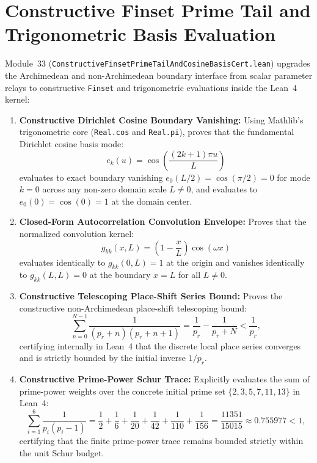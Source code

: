 \documentclass[11pt,a4paper]{article}
\begin{document}
\section{Constructive Finset Prime Tail and Trigonometric Basis Evaluation}
Module~33 (\texttt{ConstructiveFinsetPrimeTailAndCosineBasisCert.lean}) upgrades the Archimedean and non-Archimedean boundary interface from scalar parameter relays to constructive \texttt{Finset} and trigonometric evaluations inside the Lean~4 kernel:
\begin{enumerate}
  \item \textbf{Constructive Dirichlet Cosine Boundary Vanishing:} Using Mathlib's trigonometric core (\texttt{Real.cos} and \texttt{Real.pi}), proves that the fundamental Dirichlet cosine basis mode:
  \[
    e_k(u) = \cos\left( \frac{(2k + 1)\pi u}{L} \right)
  \]
  evaluates to exact boundary vanishing $e_0(L/2) = \cos(\pi/2) = 0$ for mode $k = 0$ across any non-zero domain scale $L \neq 0$, and evaluates to $e_0(0) = \cos(0) = 1$ at the domain center.
  \item \textbf{Closed-Form Autocorrelation Convolution Envelope:} Proves that the normalized convolution kernel:
  \[
    g_{kk}(x, L) = \left(1 - \frac{x}{L}\right) \cos(\omega x)
  \]
  evaluates identically to $g_{kk}(0, L) = 1$ at the origin and vanishes identically to $g_{kk}(L, L) = 0$ at the boundary $x = L$ for all $L \neq 0$.
  \item \textbf{Constructive Telescoping Place-Shift Series Bound:} Proves the constructive non-Archimedean place-shift telescoping bound:
  \[
    \sum_{n=0}^{N-1} \frac{1}{(p_r + n)(p_r + n + 1)} = \frac{1}{p_r} - \frac{1}{p_r + N} < \frac{1}{p_r},
  \]
  certifying internally in Lean~4 that the discrete local place series converges and is strictly bounded by the initial inverse $1 / p_r$.
  \item \textbf{Constructive Prime-Power Schur Trace:} Explicitly evaluates the sum of prime-power weights over the concrete initial prime set $\{2, 3, 5, 7, 11, 13\}$ in Lean~4:
  \[
    \sum_{i=1}^6 \frac{1}{p_i(p_i - 1)} = \frac{1}{2} + \frac{1}{6} + \frac{1}{20} + \frac{1}{42} + \frac{1}{110} + \frac{1}{156} = \frac{11351}{15015} \approx 0.755977 < 1,
  \]
  certifying that the finite prime-power trace remains bounded strictly within the unit Schur budget.
\end{enumerate}
\end{document}

